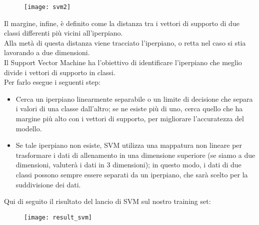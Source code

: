 \begin{figure}[H]
	\centering
	\texttt{[image: svm2]}
\end{figure}

Il margine, infine, è definito come la distanza tra i vettori di supporto di due classi differenti più vicini all’iperpiano. \\ Alla metà di questa distanza viene tracciato l’iperpiano, o retta nel caso si stia lavorando a due dimensioni. \\
Il Support Vector Machine ha l’obiettivo di identificare l’iperpiano che meglio divide i vettori di supporto in classi. \\ Per farlo esegue i seguenti step:
\begin{itemize}
	
\item Cerca un iperpiano linearmente separabile o un limite di decisione che separa i valori di una classe dall’altro; se ne esiste più di uno, cerca quello che ha margine più alto con i vettori di supporto, per migliorare l’accuratezza del modello.

\item Se tale iperpiano non esiste, SVM utilizza una mappatura non lineare per trasformare i dati di allenamento in una dimensione superiore (se siamo a due dimensioni, valuterà i dati in 3 dimensioni); in questo modo, i dati di due classi possono sempre essere separati da un iperpiano, che sarà scelto per la suddivisione dei dati.	
\end{itemize}

Qui di seguito il risultato del lancio di SVM sul nostro training set:

\begin{figure}[H]
	\centering
	\texttt{[image: result\_svm]}
\end{figure}

\newpage


